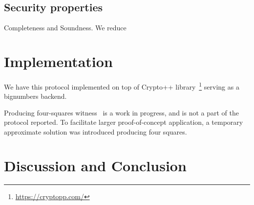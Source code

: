 \documentclass{llncs}
\begin{document}
\subsection{Security properties}

Completeness and Soundness.
We reduce

\section{Implementation}

We have this protocol implemented on top of {Crypto++} library~\footnote{\url{https://cryptopp.com/}}
serving as a bignumbers backend.

Producing four-squares witness~\cite{PollackTrevino} is a work in progress, and is not a part of the protocol reported.
To facilitate larger proof-of-concept application, a temporary approximate solution was introduced producing four squares.

\section{Discussion and Conclusion}




\end{document}

